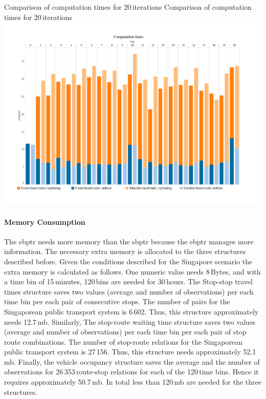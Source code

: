 \createfigure
{Comparison of computation times for 20\,iterations}
{Comparison of computation times for 20\,iterations}
{\label{fig:CompTimes}}
{\includegraphics[width=1.0\textwidth]{extending/figures/ebr/ComputationTimes.pdf}}
{}

\paragraph{Memory Consumption}

The \gls{ebptr} needs more memory than the \gls{sbptr} because the \gls{ebptr} manages more information. The necessary extra memory is allocated to the three structures described before. Given the conditions described for the Singapore scenario the extra memory is calculated as follows. One numeric value needs 8\,Bytes, and with a time bin of 15\,minutes, 120\,bins are needed for 30\,hours. The Stop-stop travel times structure saves two values (average and number of observations) per each time bin per each pair of consecutive stops. The number of pairs for the Singaporean public transport system is 6\,602. Thus, this structure approximately needs 12.7\,\gls{mb}. Similarly, The stop-route waiting time structure saves two values (average and number of observations) per each time bin per each pair of stop route combinations. The number of stop-route relations for the Singaporean public transport system is 27\,156. Thus, this structure needs approximately 52.1\,\gls{mb}. Finally, the vehicle occupancy structure saves the average and the number of observations for 26\,353\,route-stop relations for each of the 120\,time bins. Hence it requires approximately 50.7\,\gls{mb}. In total less than 120\,\gls{mb} are needed for the three structures.

